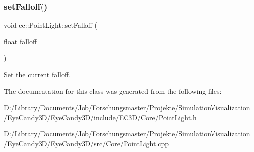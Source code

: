 \mbox{\label{classec_1_1_point_light_a64949f08f93b178b110f9c366d72ce89}} 
\subsubsection{\texorpdfstring{set\+Falloff()}{setFalloff()}}
{\footnotesize\ttfamily void ec\+::\+Point\+Light\+::set\+Falloff (\begin{DoxyParamCaption}\item[{float}]{falloff }\end{DoxyParamCaption})}



Set the current falloff. 



The documentation for this class was generated from the following files\+:\begin{DoxyCompactItemize}
\item 
D\+:/\+Library/\+Documents/\+Job/\+Forschungsmaster/\+Projekte/\+Simulation\+Visualization/\+Eye\+Candy3\+D/\+Eye\+Candy3\+D/include/\+E\+C3\+D/\+Core/\mbox{\hyperlink{_point_light_8h}{Point\+Light.\+h}}\item 
D\+:/\+Library/\+Documents/\+Job/\+Forschungsmaster/\+Projekte/\+Simulation\+Visualization/\+Eye\+Candy3\+D/\+Eye\+Candy3\+D/src/\+Core/\mbox{\hyperlink{_point_light_8cpp}{Point\+Light.\+cpp}}\end{DoxyCompactItemize}
